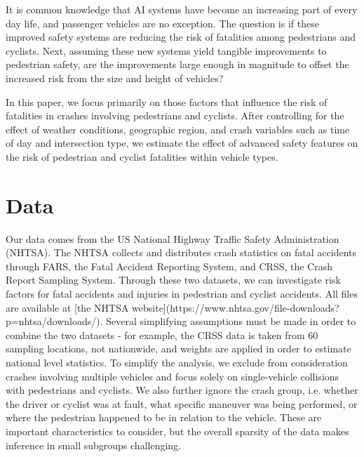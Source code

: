 \documentclass[12pt]{article}
\begin{document}
It is common knowledge that AI systems have become an increasing part of every day life, and passenger
vehicles are no exception. The question is if these improved safety systems are reducing the risk of fatalities
among pedestrians and cyclists. Next, assuming these new systems yield tangible improvements to pedestrian safety,
are the improvements large enough in magnitude to offset the increased risk from the size and height of vehicles?

In this paper, we focus primarily on those factors that influence the risk of fatalities in crashes involving pedestrians
and cyclists. After controlling for the effect of weather conditions,
geographic region, and crash variables such as time of day and intersection type, we estimate the effect
of advanced safety features on the risk of pedestrian and cyclist fatalities within vehicle types.


\section{Data}

Our data comes from the US National Highway Traffic Safety Administration (NHTSA). The NHTSA collects and distributes
crash statistics on fatal accidents through FARS, the Fatal Accident Reporting System, and CRSS, the Crash Report
Sampling System. Through these two datasets, we can investigate risk factors for fatal accidents and injuries in
pedestrian and cyclist accidents. All files are available at
    [the NHTSA website](https://www.nhtsa.gov/file-downloads?p=nhtsa/downloads/). Several simplifying assumptions must be
made in order to combine the two datasets - for example, the CRSS data is taken from 60 sampling locations, not
nationwide, and weights are applied in order to estimate national level
statistics\cite{national_highway_traffic_safety_administration_crash_nodate}.  To simplify the analysis, we exclude
from consideration crashes involving multiple vehicles and focus solely on single-vehicle collisions with pedestrians
and cyclists. We also further ignore the crash group, i.e. whether the driver or cyclist was at fault, what
specific maneuver was being performed, or where the pedestrian happened to be in relation to the vehicle. These are
important characteristics to consider, but the overall sparsity of the data makes inference in small subgroups
challenging.

\end{document}
